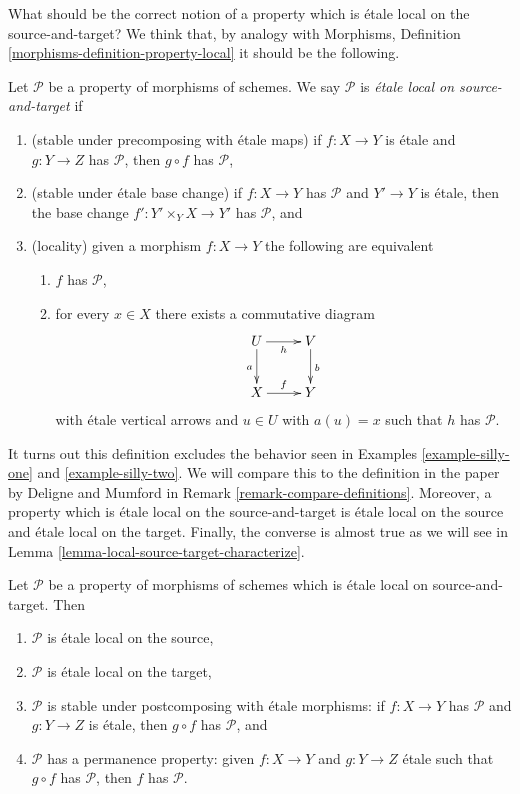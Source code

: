 \noindent
What should be the correct notion of a property which is \'etale local
on the source-and-target? We think that, by analogy with
Morphisms, Definition \ref{morphisms-definition-property-local}
it should be the following.

\begin{definition}
\label{definition-local-source-target}
Let $\mathcal{P}$ be a property of morphisms of schemes.
We say $\mathcal{P}$ is {\it \'etale local on source-and-target} if
\begin{enumerate}
\item (stable under precomposing with \'etale maps)
if $f : X \to Y$ is \'etale and $g : Y \to Z$ has $\mathcal{P}$,
then $g \circ f$ has $\mathcal{P}$,
\item (stable under \'etale base change)
if $f : X \to Y$ has $\mathcal{P}$ and $Y' \to Y$ is \'etale, then
the base change $f' : Y' \times_Y X \to Y'$ has $\mathcal{P}$, and
\item (locality) given a morphism $f : X \to Y$ the following are equivalent
\begin{enumerate}
\item $f$ has $\mathcal{P}$,
\item for every $x \in X$ there exists a commutative diagram
$$
\xymatrix{
U \ar[d]_a \ar[r]_h & V \ar[d]^b \\
X \ar[r]^f & Y
}
$$
with \'etale vertical arrows and $u \in U$ with $a(u) = x$ such that
$h$ has $\mathcal{P}$.
\end{enumerate}
\end{enumerate}
\end{definition}

\noindent
It turns out this definition excludes the behavior seen in
Examples \ref{example-silly-one} and \ref{example-silly-two}.
We will compare this to the definition in the paper
\cite{DM} by Deligne and Mumford in
Remark \ref{remark-compare-definitions}.
Moreover, a property which is \'etale local on the source-and-target is
\'etale local on the source and \'etale local on the target.
Finally, the converse is almost true as we will see in
Lemma \ref{lemma-local-source-target-characterize}.

\begin{lemma}
\label{lemma-local-source-target-implies}
Let $\mathcal{P}$ be a property of morphisms of schemes which is
\'etale local on source-and-target. Then
\begin{enumerate}
\item $\mathcal{P}$ is \'etale local on the source,
\item $\mathcal{P}$ is \'etale local on the target,
\item $\mathcal{P}$ is stable under postcomposing with \'etale morphisms:
if $f : X \to Y$ has $\mathcal{P}$ and $g : Y \to Z$ is \'etale, then
$g \circ f$ has $\mathcal{P}$, and
\item $\mathcal{P}$ has a permanence property: given $f : X \to Y$ and
$g : Y \to Z$ \'etale such that $g \circ f$ has $\mathcal{P}$, then
$f$ has $\mathcal{P}$.
\end{enumerate}
\end{lemma}

